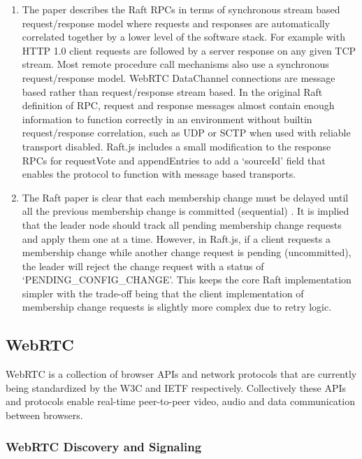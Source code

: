 \documentclass[conference,compsoc]{./IEEEtran/IEEEtran}
\begin{document}
\begin{enumerate}
\item The paper describes the Raft RPCs in terms of synchronous stream
    based request/response model where requests and responses are
    automatically correlated together by a lower level of the software
    stack. For example with HTTP 1.0 \cite{http:rfc1945} client
    requests are followed by a server response on any given TCP
    stream. Most remote procedure call mechanisms also use
    a synchronous request/response model. %
    WebRTC DataChannel connections are message based rather than
    request/response stream based. %
    In the original Raft definition of RPC, request and response messages
    almost contain enough information to function correctly in an
    environment without builtin request/response correlation, such as
    UDP or SCTP when used with reliable transport disabled. %
    Raft.js includes a small modification to the response RPCs for
    requestVote and appendEntries to add a `sourceId' field that
    enables the protocol to function with message based transports.
\item The Raft paper is clear that each membership change must be
    delayed until all the previous membership change is committed
    (sequential) \cite[Section~4.1]{raft_thesis:ongaro14}. It is
    implied that the leader node should track all pending membership
    change requests and apply them one at a time.  However, in
    Raft.js, if a client requests a membership change while another
    change request is pending (uncommitted), the leader will reject
    the change request with a status of `PENDING\_CONFIG\_CHANGE'.
    This keeps the core Raft implementation simpler with the trade-off
    being that the client implementation of membership change requests
    is slightly more complex due to retry logic.
\end{enumerate}

\subsection{WebRTC}

WebRTC is a collection of browser APIs \cite{webrtc:feb2015} and
network protocols \cite{draft-rtcweb-overview} that are currently
being standardized by the W3C and IETF respectively. Collectively these
APIs and protocols enable real-time peer-to-peer video, audio and data
communication between browsers.

\subsubsection{WebRTC Discovery and Signaling}
\end{document}
